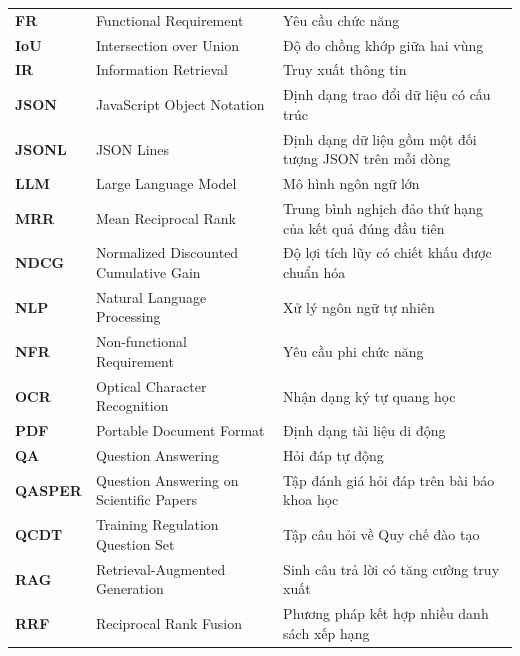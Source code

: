\documentclass[../DoAn.tex]{subfiles}
\begin{document}
\begin{longtable}{
    @{}
    >{\raggedright\arraybackslash}p{}
    >{\raggedright\arraybackslash}p{}
    >{\raggedright\arraybackslash}p{}
    @{}
}
\textbf{FR}
& Functional Requirement
& Yêu cầu chức năng \\

\textbf{IoU}
& Intersection over Union
& Độ đo chồng khớp giữa hai vùng \\

\textbf{IR}
& Information Retrieval
& Truy xuất thông tin \\

\textbf{JSON}
& JavaScript Object Notation
& Định dạng trao đổi dữ liệu có cấu trúc \\

\textbf{JSONL}
& JSON Lines
& Định dạng dữ liệu gồm một đối tượng JSON trên mỗi dòng \\

\textbf{LLM}
& Large Language Model
& Mô hình ngôn ngữ lớn \\

\textbf{MRR}
& Mean Reciprocal Rank
& Trung bình nghịch đảo thứ hạng của kết quả đúng đầu tiên \\

\textbf{NDCG}
& Normalized Discounted Cumulative Gain
& Độ lợi tích lũy có chiết khấu được chuẩn hóa \\

\textbf{NLP}
& Natural Language Processing
& Xử lý ngôn ngữ tự nhiên \\

\textbf{NFR}
& Non-functional Requirement
& Yêu cầu phi chức năng \\

\textbf{OCR}
& Optical Character Recognition
& Nhận dạng ký tự quang học \\

\textbf{PDF}
& Portable Document Format
& Định dạng tài liệu di động \\

\textbf{QA}
& Question Answering
& Hỏi đáp tự động \\

\textbf{QASPER}
& Question Answering on Scientific Papers
& Tập đánh giá hỏi đáp trên bài báo khoa học \\

\textbf{QCDT}
& Training Regulation Question Set
& Tập câu hỏi về Quy chế đào tạo \\

\textbf{RAG}
& Retrieval-Augmented Generation
& Sinh câu trả lời có tăng cường truy xuất \\

\textbf{RRF}
& Reciprocal Rank Fusion
& Phương pháp kết hợp nhiều danh sách xếp hạng \\


\end{longtable}
\end{document}
